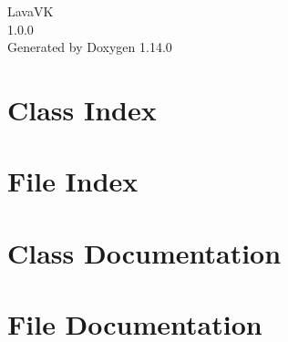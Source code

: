 \documentclass[twoside]{book}
\newcommand{\+}{\discretionary{\mbox{\scriptsize$\hookleftarrow$}}{}{}}
\newcommand{\clearemptydoublepage}{%
    \newpage{\pagestyle{empty}\cleardoublepage}%
  }
\begin{document}
  \raggedbottom
    \hypersetup{pageanchor=false,
                bookmarksnumbered=true,
                pdfencoding=unicode
               }
  \begin{titlepage}
  \vspace*{7cm}
  \begin{center}%
  {\Large Lava\+VK}\\
  [1ex]\large 1.\+0.\+0 \\
  \vspace*{1cm}
  {\large Generated by Doxygen 1.14.0}\\
  \end{center}
  \end{titlepage}
  \clearemptydoublepage
  \tableofcontents
  \clearemptydoublepage
  \hypersetup{pageanchor=true}

\chapter{Class Index}

\chapter{File Index}

\chapter{Class Documentation}




\chapter{File Documentation}




  \backmatter
  \newpage
  \clearemptydoublepage
  \printindex
\end{document}
